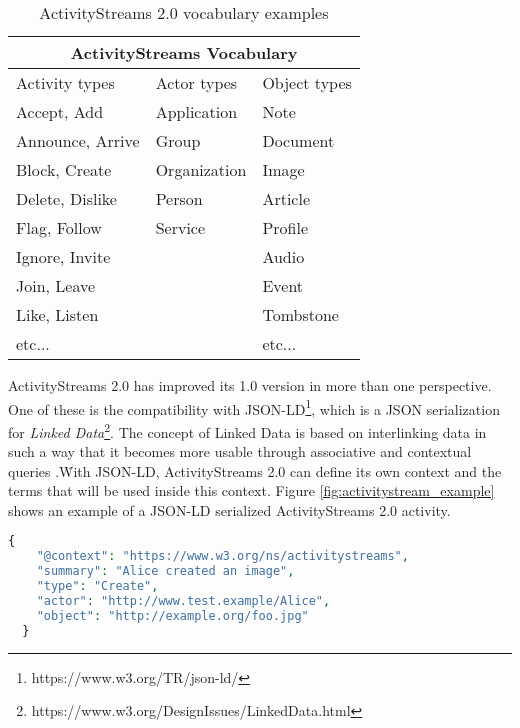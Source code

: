 \begin{table}[H]
  \centering
  \begin{tabular}{|p{4cm}|p{4cm}|p{4cm}| }
    \hline
    \multicolumn{3}{|c|}{ActivityStreams Vocabulary} \\
    \hline
    Activity types & Actor types & Object types \\
    \hline
    \hline
      Accept, Add & Application & Note \\
      Announce, Arrive & Group & Document \\ 
      Block, Create & Organization & Image \\
      Delete, Dislike & Person & Article \\
      Flag, Follow & Service & Profile \\
      Ignore, Invite & & Audio \\
      Join, Leave & & Event \\
      Like, Listen & & Tombstone \\
      etc... & & etc... \\
      \hline
  \end{tabular}
  \caption{ActivityStreams 2.0 vocabulary examples}
  \label{table:activitystreams_vocabulary}
\end{table}

ActivityStreams 2.0 has improved its 1.0 version in more than one perspective. One of these is the compatibility with JSON-LD\footnote{https://www.w3.org/TR/json-ld/}, which is a JSON serialization for \emph{Linked Data}\footnote{https://www.w3.org/DesignIssues/LinkedData.html}. The concept of Linked Data is based on interlinking data in such a way that it becomes more usable through associative and contextual queries \cite{berners-lee_2006}.\. With JSON-LD, ActivityStreams 2.0 can define its own context and the terms that will be used inside this context. Figure \ref{fig:activitystream_example} shows an example of a JSON-LD serialized ActivityStreams 2.0 activity. 

\lstset{style=JSONStyle}
\begin{lstlisting}[language=PHP, caption=Example of activity \cite{snell_prodromou_2017}, label=fig:activitystream_example, float=h]
  {
    "@context": "https://www.w3.org/ns/activitystreams",
    "summary": "Alice created an image",
    "type": "Create",
    "actor": "http://www.test.example/Alice",
    "object": "http://example.org/foo.jpg"
  }
\end{lstlisting}


